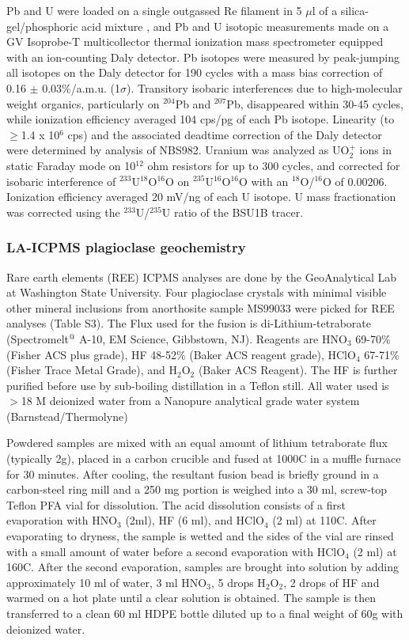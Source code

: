 \documentclass[11pt,letterpaper]{article}
\begin{document}
Pb and U were loaded on a single outgassed Re filament in 5 $\mu$l of a silica-gel/phosphoric acid mixture \citep{Gerstenberger1997a}, and Pb and U isotopic measurements made on a GV Isoprobe-T multicollector thermal ionization mass spectrometer equipped with an ion-counting Daly detector. Pb isotopes were measured by peak-jumping all isotopes on the Daly detector for 190 cycles with a mass bias correction of 0.16 $\pm$ 0.03$\%$/a.m.u. (1$\sigma$). Transitory isobaric interferences due to high-molecular weight organics, particularly on $^{204}$Pb and $^{207}$Pb, disappeared within 30-45 cycles, while ionization efficiency averaged 104 cps/pg of each Pb isotope. Linearity (to $\geq$1.4 x 10$^6$ cps) and the associated deadtime correction of the Daly detector were determined by analysis of NBS982. Uranium was analyzed as UO$_2^+$ ions in static Faraday mode on 10$^{12}$ ohm resistors for up to 300 cycles, and corrected for isobaric interference of $^{233}$U$^{18}$O$^{16}$O on $^{235}$U$^{16}$O$^{16}$O with an $^{18}$O/$^{16}$O of 0.00206. Ionization efficiency averaged 20 mV/ng of each U isotope. U mass fractionation was corrected using the $^{233}$U/$^{235}$U ratio of the BSU1B tracer. 

\subsubsection*{LA-ICPMS plagioclase geochemistry}

Rare earth elements (REE) ICPMS analyses are done by the GeoAnalytical Lab at Washington State University. Four plagioclase crystals with minimal visible other mineral inclusions from anorthosite sample MS99033 were picked for REE analyses (Table S3). The Flux used for the fusion is di-Lithium-tetraborate (Spectromelt$^@$ A-10, EM Science, Gibbstown, NJ). Reagents are HNO$_3$ 69-70\% (Fisher ACS plus grade), HF 48-52\% (Baker ACS reagent grade), HClO$_4$ 67-71\% (Fisher Trace Metal Grade), and H$_2$O$_2$ (Baker ACS Reagent). The HF is further purified before use by sub-boiling distillation in a Teflon still.  All water used is $>$18 M deionized water from a Nanopure analytical grade water system (Barnstead/Thermolyne)

Powdered samples are mixed with an equal amount of lithium tetraborate flux (typically 2g), placed in a carbon crucible and fused at 1000\textdegree C in a muffle furnace for 30 minutes. After cooling, the resultant fusion bead is briefly ground in a carbon-steel ring mill and a 250 mg portion is weighed into a 30 ml, screw-top Teflon PFA vial for dissolution. The acid dissolution consists of a first evaporation with HNO$_3$ (2ml), HF (6 ml), and HClO$_4$ (2 ml) at 110\textdegree C. After evaporating to dryness, the sample is wetted and the sides of the vial are rinsed with a small amount of water before a second evaporation with HClO$_4$ (2 ml) at 160\textdegree C. After the second evaporation, samples are brought into solution by adding approximately 10 ml of water, 3 ml HNO$_3$, 5 drops H$_2$O$_2$, 2 drops of HF and warmed on a hot plate until a clear solution is obtained. The sample is then transferred to a clean 60 ml HDPE bottle diluted up to a final weight of 60g with deionized water.
\end{document}
